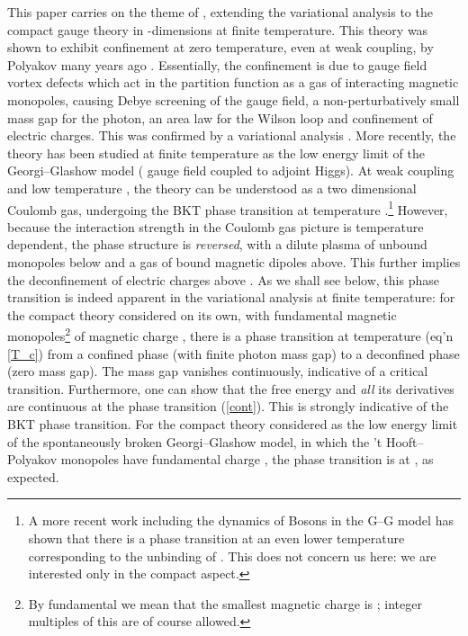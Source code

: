 \documentclass[a4paper,a4paper]{article}
\begin{document}
This paper carries on the theme of \cite{Kogan:2002yr}, 
extending the variational analysis to the compact \coordHE{} gauge theory in \coordHE{}-dimensions at finite temperature.
This theory was shown to exhibit confinement at zero temperature, even at weak coupling, 
by Polyakov many years ago \cite{Polyakov:1977fu}. Essentially, the confinement is due to gauge field vortex defects 
which act in the partition function as a gas of interacting magnetic monopoles, causing Debye screening of the gauge field, 
a non-perturbatively small mass gap for the photon, an area law for the Wilson loop
and confinement of electric charges.
This was confirmed by a variational analysis \cite{Kogan:1995vb, Kovner:1998eg}. 
More recently, the theory has been studied at finite temperature \cite{Svetitsky:1982gs, Agasian:1998wv}
as the low energy limit of the Georgi--Glashow model (\coordHE{} gauge field coupled to adjoint Higgs). 
At weak coupling \coordHE{} and low temperature \coordHE{}, the theory can be understood as a two dimensional Coulomb gas,
undergoing the BKT phase transition \cite{Berezinskii:1971,Kosterlitz:1973xp} at temperature \coordHE{}.\footnote{A more
recent work \cite{Dunne:2000vp} including the dynamics of \coordHE{} Bosons in the G--G model has shown
that there is a phase transition at an even lower temperature corresponding to the unbinding of \coordHE{}.
This does not concern us here: we are interested only in the compact \coordHE{} aspect.} 
However, because the interaction strength
in the Coulomb gas picture is temperature dependent, the phase structure is \emph{reversed}, with a dilute plasma
of unbound monopoles below \coordHE{} and a gas of bound magnetic dipoles above. This further implies the deconfinement of 
electric charges above \coordHE{}. As we shall see below, this phase transition is indeed apparent in the variational analysis
at finite temperature: for the compact \coordHE{} theory considered on its own, with fundamental magnetic monopoles\footnote{By
fundamental we mean that the smallest magnetic charge is \coordHE{}; integer multiples of this are of course allowed.}
of magnetic charge \coordHE{}, there is a phase transition at temperature \coordHE{} (eq'n \ref{T_c}) from a
confined phase (with finite photon mass gap) to a deconfined phase (zero mass gap). The mass gap vanishes continuously,
indicative of a critical transition. Furthermore, one can show that the free energy and \emph{all} its derivatives
are continuous at the phase transition (\ref{cont}). 
This is strongly indicative of the BKT phase transition. For the compact \coordHE{}
theory considered as the low energy limit of the spontaneously broken Georgi--Glashow model, in which the 't Hooft--Polyakov
monopoles have fundamental charge \coordHE{} \cite{Kovner:1992fm}, the phase transition is at \coordHE{}, as expected.
\end{document}
